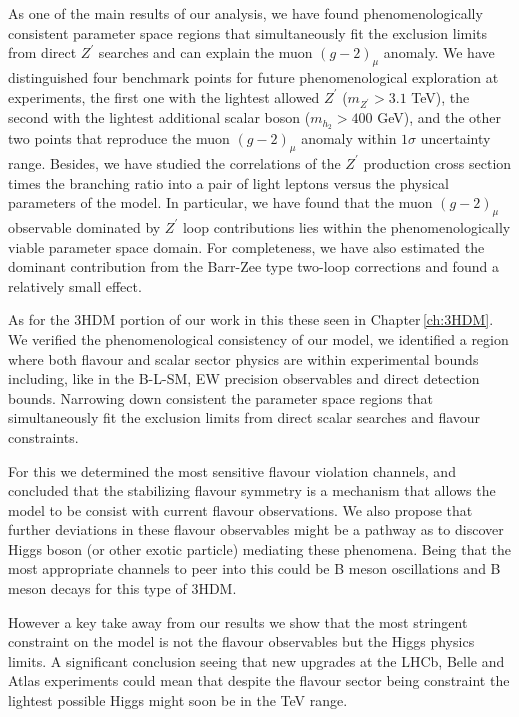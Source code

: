 As one of the main results of our analysis, we have found phenomenologically consistent parameter space regions that simultaneously fit the exclusion limits from direct $Z^\prime$ searches and can explain the muon $(g-2)_{\mu}$ anomaly. 
%
We have distinguished four benchmark points for future phenomenological exploration at experiments, the first one with the lightest allowed $Z^\prime$ ($m_{Z^\prime}>3.1$ TeV), the second with the lightest additional scalar boson ($m_{h_2}>400$ GeV), and the other two points that reproduce the muon $(g-2)_{\mu}$ anomaly within $1\sigma$ uncertainty range. 
%
Besides, we have studied the correlations of the $Z^\prime$ production cross section times the branching ratio into a pair of light leptons versus the physical parameters of the model.
%
In particular, we have found that the muon $(g-2)_{\mu}$ observable dominated by $Z^\prime$ loop contributions lies within the phenomenologically viable parameter space domain. 
%
For completeness, we have also estimated the dominant contribution from the Barr-Zee type two-loop corrections and found a relatively small effect.


As for the 3HDM portion of our work in this these seen in  Chapter\,\ref{ch:3HDM}. 
%
We verified the phenomenological consistency of our model, we identified a region where both flavour and scalar sector physics are within experimental bounds including, like in the B-L-SM, EW precision observables and direct detection bounds.  
%
%
Narrowing down consistent the parameter space regions that simultaneously fit the exclusion limits from direct scalar searches and flavour constraints. 

For this we determined the most sensitive flavour violation channels, and concluded that the stabilizing flavour symmetry is a mechanism that allows the model to be consist with current flavour observations. 
%
We also propose that further deviations in these flavour observables might be a pathway as to discover Higgs boson (or other exotic particle) mediating these phenomena. 
%
Being that the most appropriate channels to peer into this could be B meson oscillations and B meson decays for this type of 3HDM.

However a key take away from our results we show that the most stringent constraint on the model is not the flavour observables but the Higgs physics limits. 
%
A significant conclusion seeing that new upgrades at the LHCb, Belle and Atlas experiments could mean that despite the flavour sector being constraint the lightest possible Higgs might soon be in the TeV range. 

